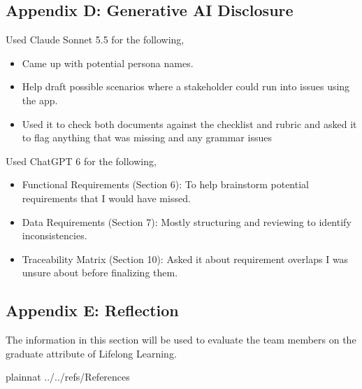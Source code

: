 \documentclass[12pt]{article}
\newcounter{sn}
\newcounter{isn}
\begin{document}
  \subsection{Appendix D: Generative AI Disclosure}

  \noindent Used Claude Sonnet 5.5 for the following,
  \noindent \begin{itemize}
    \item Came up with potential persona names.
    \item Help draft possible scenarios where a stakeholder could run into issues using the app.
    \item Used it to check both documents against the checklist and rubric and
          asked it to flag anything that was missing and any grammar issues
  \end{itemize}

  \noindent Used ChatGPT 6 for the following,
  \noindent \begin{itemize}
    \item Functional Requirements (Section 6): To help brainstorm potential requirements that I would have missed.
    \item Data Requirements (Section 7): Mostly structuring and reviewing to identify inconsistencies.
    \item Traceability Matrix (Section 10): Asked it about requirement overlaps I was unsure about before finalizing them.
  \end{itemize}
  
  \subsection{Appendix E: Reflection}


  The information in this section will be used to evaluate the team members on the
  graduate attribute of Lifelong Learning.

  

  

  \newpage

   {plainnat}
   {../../refs/References}

  \newpage
\end{document}
